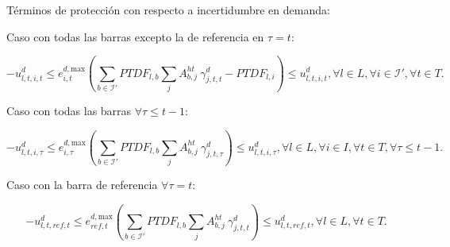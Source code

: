 Términos de protección con respecto a incertidumbre en demanda:

Caso con todas las barras excepto la de referencia en $\tau = t$:

\begin{equation}
-u_{l,t,i,t}^{d} \le e_{i,t}^{d, \text{max}} \left ( \sum_{b \in \mathcal{I}'}PTDF_{l,b} \sum_{j}A_{b,j}^{ht} \: \gamma_{j,t,t}^{d} - PTDF_{l,i} \right ) \le u_{l,t,i,t}^{d} , \forall l \in L, \forall i \in \mathcal{I}', \forall t \in T.
\end{equation}

Caso con todas las barras $\forall \tau \leq t-1$:

\begin{equation}
-u_{l,t,i,\tau}^{d} \le e_{i,\tau}^{d, \text{max}} \left ( \sum_{b \in \mathcal{I}'}PTDF_{l,b} \sum_{j}A_{b,j}^{ht} \: \gamma_{j,t,\tau}^{d} \right ) \le u_{l,t,i,\tau}^{d} , \forall l \in L, \forall i \in I, \forall t \in T, \forall \tau \le t-1.
\end{equation}

Caso con la barra de referencia $\forall \tau = t$:

\begin{equation}
-u_{l,t,ref,t}^{d} \le e_{ref,t}^{d, \text{max}} \left ( \sum_{b \in \mathcal{I}'}PTDF_{l,b} \sum_{j}A_{b,j}^{ht} \: \gamma_{j,t,t}^{d} \right ) \le u_{l,t,ref,t}^{d} , \forall l \in L, \forall t \in T.
\end{equation}






